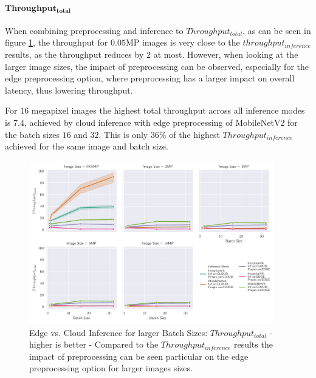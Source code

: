 \paragraph{$\mathbf{Throughput_{total}}$}
When combining preprocessing and inference to $Throughput_{total}$, as can be seen in figure \ref{fig:BatchSizeTotalThroughput}, the throughput for $0.05$MP images is very close to the $throughput_{inference}$ results, as the throughput reduces by $2$ at most.
However, when looking at the larger image sizes, the impact of preprocessing can be observed, especially for the edge preprocessing option, where preprocessing has a larger impact on overall latency, thus lowering throughput.

For $16$ megapixel images the highest total throughput across all inference modes is $7.4$, achieved by cloud inference with edge preprocessing of MobileNetV2 for the batch sizes $16$ and $32$.
This is only $36\%$ of the highest $Throughput_{inference}$ achieved for the same image and batch size.
\begin{figure}[!htb]
\centering
\includegraphics[width=0.95\textwidth]{./Bilder/single_plots/batch_size_plots/Effects_of_Batch_size_Total_Throughput_(Preprocessing_+_Inference).pdf}
\caption[Edge vs. Cloud Inference for larger Batch Sizes:  $Throughput_{total}$ - higher is better]{Edge vs. Cloud Inference for larger Batch Sizes:  $Throughput_{total}$ - higher is better - Compared to the $Throughput_{inference}$ results the impact of preprocessing can be seen particular on the edge preprocessing option for larger images sizes.}
\label{fig:BatchSizeTotalThroughput}
\end{figure}


\FloatBarrier

